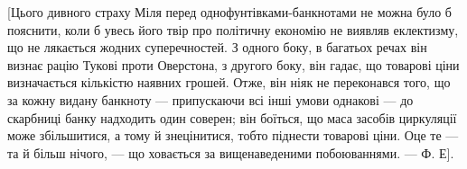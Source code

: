 [Цього дивного страху Міля перед однофунтівками-банкнотами не можна
було б пояснити, коли б увесь його твір про політичну економію не виявляв
еклектизму, що не лякається жодних суперечностей. З одного боку, в багатьох
речах він визнає рацію Тукові проти Оверстона, з другого боку, він гадає, що
товарові ціни визначається кількістю наявних грошей. Отже, він ніяк не переконався
того, що за кожну видану банкноту — припускаючи всі інші умови
однакові — до скарбниці банку надходить один соверен; він боїться, що маса
засобів циркуляції може збільшитися, а тому й знецінитися, тобто піднести
товарові ціни. Оце те — та й більш нічого, — що ховається за вищенаведеними
побоюваннями. — Ф. Е].
